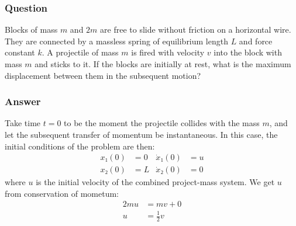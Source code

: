 \subsubsection{Question}

Blocks of mass $m$ and $2m$ are free to slide without friction on a
horizontal wire. They are connected by a massless spring of equilibrium
length $L$ and force constant $k$. A projectile of mass $m$ is fired with
velocity $v$ into the block with mass $m$ and sticks to it. If the blocks
are initially at rest, what is the maximum displacement between them in the
subsequent motion?

\subsubsection{Answer}

Take time $t=0$ to be the moment the projectile collides with the mass $m$,
and let the subsequent transfer of momentum be instantaneous. In this case,
the initial conditions of the problem are then:
\begin{align*}
    x₁(0) &= 0			& \dot x₁(0) &= u \\
    x₂(0) &= L			& \dot x₂(0) &= 0
\end{align*}
where $u$ is the initial velocity of the combined project-mass system. We get
$u$ from conservation of mometum:
\begin{align*}
    2mu &= mv + 0 \\
    u &= \frac 12 v
\end{align*}

